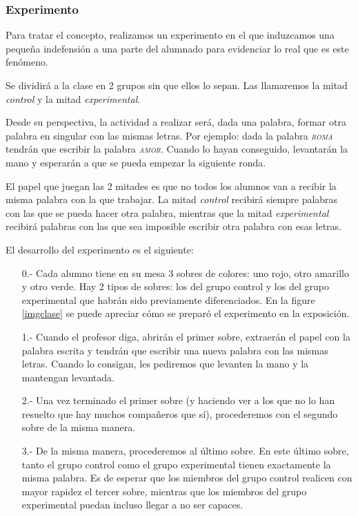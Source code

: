 \subsubsection{Experimento}

Para tratar el concepto, realizamos un experimento en el que induzcamos una pequeña indefensión a una parte del alumnado para evidenciar lo real que es este fenómeno.

Se dividirá a la clase en 2 grupos sin que ellos lo sepan.
%
Las llamaremos la mitad \textit{control} y la mitad \textit{experimental}.

Desde su perspectiva, la actividad a realizar será, dada una palabra, formar otra palabra en singular con las mismas letras.
%
Por ejemplo: dada la palabra \textit{\textsc{roma}} tendrán que escribir la palabra \textit{\textsc{amor}}. 
%
Cuando lo hayan conseguido, levantarán la mano y esperarán a que se pueda empezar la siguiente ronda.

El papel que juegan las 2 mitades es que no todos los alumnos van a recibir la misma palabra con la que trabajar. 
%
La mitad \textit{control} recibirá siempre palabras con las que se pueda hacer otra palabra, mientras que la mitad \textit{experimental} recibirá palabras con las que sea imposible escribir otra palabra con esas letras.

El desarrollo del experimento es el siguiente:

\begin{itemize}
	\item[0.-] Cada alumno tiene en su mesa 3 sobres de colores: uno rojo, otro amarillo y otro verde.
	\subitem Hay 2 tipos de sobres: los del grupo control y los del grupo experimental que habrán sido previamente diferenciados. En la figure \ref{imgclase} se puede apreciar cómo se preparó el experimento en la exposición.
	\item[1.-] Cuando el profesor diga, abrirán el primer sobre, extraerán el papel con la palabra escrita y tendrán que escribir una nueva palabra con las mismas letras. Cuando lo consigan, les pediremos que levanten la mano y la mantengan levantada.
	\item[2.-] Una vez terminado el primer sobre (y haciendo ver a los que no lo han resuelto que hay muchos compañeros que sí), procederemos con el segundo sobre de la misma manera.
	\item[3.-] De la misma manera, procederemos al último sobre. 
	En este último sobre, tanto el grupo control como el grupo experimental tienen exactamente la misma palabra. 
	Es de esperar que los miembros del grupo control realicen con mayor rapidez el tercer sobre, mientras que los miembros del grupo experimental puedan incluso llegar a no ser capaces.
\end{itemize}


